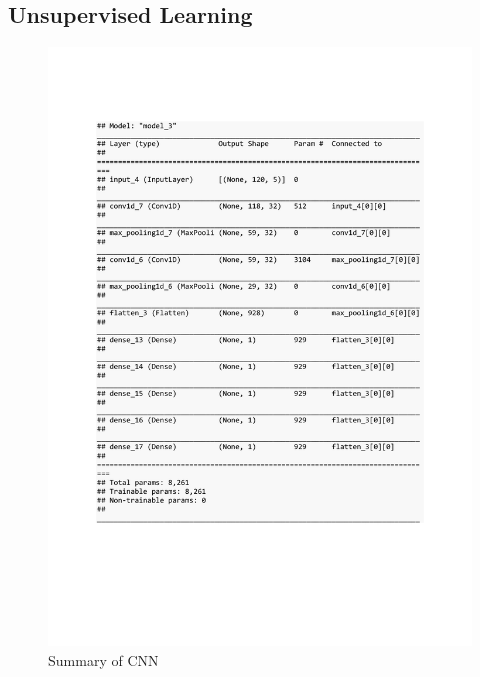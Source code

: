 \subsection{Unsupervised Learning}
\begin{figure}[h]
	\centering
	\includegraphics[scale=0.5]{Figures/summary_CNN_pred_syn}
	\decoRule
	\caption[Experiment 1: Summary of CNN for unsupervised learning]{Summary of CNN \parencite{own}}
	\label{fig:summary_CNN_pred_syn}
\end{figure}

